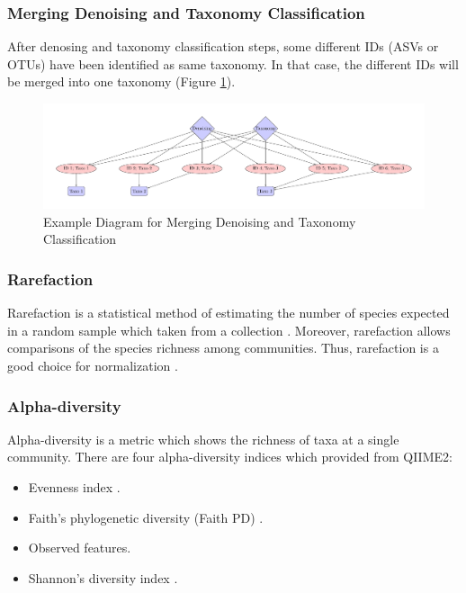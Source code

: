 \documentclass[a4paper]{article}
\begin{document}
            \subsubsection{Merging Denoising and Taxonomy Classification}
                After denosing and taxonomy classification steps, some different IDs (ASVs or OTUs) have been identified as same taxonomy. In that case, the different IDs will be merged into one taxonomy (Figure \ref{fig:merging}).

                \begin{figure}[p]
                    \centering
                    \includegraphics[width=0.8 \linewidth]{figures/Merging/merging.pdf}
                    \caption{Example Diagram for Merging Denoising and Taxonomy Classification}
                    \label{fig:merging}
                \end{figure}

            \subsubsection{Rarefaction}
                Rarefaction is a statistical method of estimating the number of species expected in a random sample which taken from a collection \cite{rarefaction1}. Moreover, rarefaction allows comparisons of the species richness among communities. Thus, rarefaction is a good choice for normalization \cite{rarefaction2}.

            \subsubsection{Alpha-diversity}
                Alpha-diversity is a metric which shows the richness of taxa at a single community. There are four alpha-diversity indices which provided from QIIME2:
                \begin{itemize}
                    \item Evenness index \cite{evenness1}.
                    \item Faith's phylogenetic diversity (Faith PD) \cite{faith1}.
                    \item Observed features.
                    \item Shannon's diversity index \cite{shannon1}.
                \end{itemize}
\end{document}
